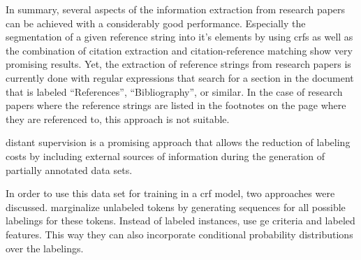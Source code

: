 \bigskip




\bigskip

In summary, several aspects of the information extraction from research papers can be achieved with a considerably good performance.
Especially the segmentation of a given reference string into it's elements by using \glspl{crf} \citep{peng2004accurate,councill2008parscit,groza2012reference} as well as the combination of citation extraction and citation-reference matching \citep{powley2007evidence} show very promising results.
Yet, the extraction of reference strings from research papers is currently done with regular expressions that search for a section in the document that is labeled ``References'', ``Bibliography'', or similar.
In the case of research papers where the reference strings are listed in the footnotes on the page where they are referenced to, this approach is not suitable.

\Gls{distant supervision} is a promising approach that allows the reduction of labeling costs by including external sources of information during the generation of partially annotated data sets.

In order to use this data set for training in a \gls{crf} model, two approaches were discussed.
\citet{tsuboi2008training} marginalize unlabeled tokens by generating sequences for all possible labelings for these tokens.
Instead of labeled instances, \citet{mann2008generalized} use \gls{ge} criteria and labeled features.
This way they can also incorporate \glspl{conditional probability distribution} over the labelings.



